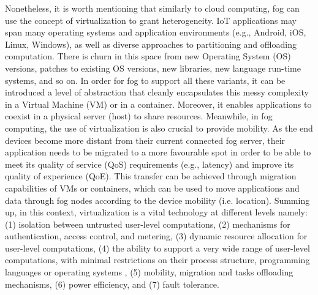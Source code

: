 Nonetheless, it is worth mentioning that similarly to cloud computing, fog can use the concept of virtualization to grant heterogeneity. IoT applications may span many operating systems and application environments (e.g., Android, iOS, Linux, Windows), as well as diverse approaches to partitioning and offloading computation. There is churn in this space from new Operating System (OS) versions, patches to existing OS versions, new libraries, new language run-time systems, and so on. In order for fog to support all these variants, it can be introduced a level of abstraction that cleanly encapsulates this messy complexity in a Virtual Machine (VM) or in a container. Moreover, it enables applications to coexist in a physical server (host) to share resources. Meanwhile, in fog computing, the use of virtualization is also crucial to provide mobility. As the end devices become more distant from their current connected fog server, their application needs to be migrated to a more favourable spot in order to be able to meet its quality of service (QoS) requirements (e.g., latency) and improve its quality of experience (QoE). This transfer can be achieved through migration capabilities of VMs or containers, which can be used to move applications and data through fog nodes according to the device mobility (i.e. location). Summing up, in this context, virtualization is a vital technology at different levels namely: (1) isolation between untrusted user-level computations, (2) mechanisms for authentication, access control, and metering, (3) dynamic resource allocation for user-level computations, (4) the ability to support a very wide range of user-level computations, with minimal restrictions on their process structure, programming languages or operating systems \cite{Cloudlet83:online}, (5) mobility, migration and tasks offloading mechanisms, (6) power efficiency, and (7) fault tolerance.\\ [6pt]
